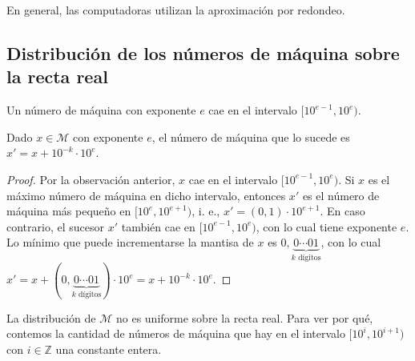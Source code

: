 En general, las computadoras utilizan la aproximación por redondeo.

\subsection{Distribución de los números de máquina sobre la recta real}

\begin{obs}
Un número de máquina con exponente $e$ cae en el intervalo $[10^{e - 1}, 10^e)$.
\end{obs}

\begin{lema}
\label{lema:suc}
Dado $x \in \mathcal{M}$ con exponente $e$, el número de máquina que lo sucede es $x' = x + 10^{-k} \cdot 10^e$.

\begin{proof}
Por la observación anterior, $x$ cae en el intervalo $[10^{e - 1}, 10^e)$. Si $x$ es el máximo número de máquina en dicho intervalo, entonces $x'$ es el número de máquina más pequeño en $[10^e, 10^{e + 1})$, i. e., $x' = (0,1) \cdot 10^{e + 1}$. En caso contrario, el sucesor $x'$ también cae en $[10^{e - 1}, 10^e)$, con lo cual tiene exponente $e$. Lo mínimo que puede incrementarse la mantisa de $x$ es $0,\underbrace{0 \cdots 01}_{k \text{ dígitos}}$, con lo cual $x' = x + (0,\underbrace{0 \cdots 01}_{k \text{ dígitos}}) \cdot 10^e = x + 10^{-k} \cdot 10^e$.
\end{proof}
\end{lema}

La distribución de $\mathcal{M}$ no es uniforme sobre la recta real. Para ver por qué, contemos la cantidad de números de máquina que hay en el intervalo $[10^{i}, 10^{i + 1})$ con $i \in \mathbb{Z}$ una constante entera.

